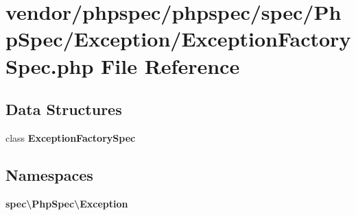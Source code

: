 \section{vendor/phpspec/phpspec/spec/\+Php\+Spec/\+Exception/\+Exception\+Factory\+Spec.php File Reference}
\label{_exception_factory_spec_8php}
\subsection*{Data Structures}
\begin{DoxyCompactItemize}
\item 
class {\bf Exception\+Factory\+Spec}
\end{DoxyCompactItemize}
\subsection*{Namespaces}
\begin{DoxyCompactItemize}
\item 
 {\bf spec\textbackslash{}\+Php\+Spec\textbackslash{}\+Exception}
\end{DoxyCompactItemize}
